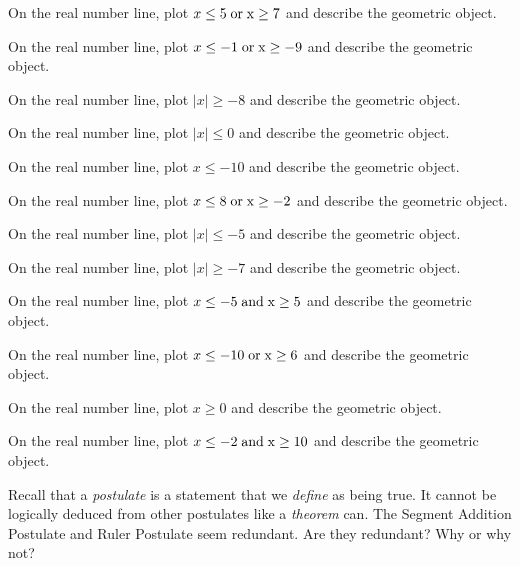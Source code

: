 \documentclass[12pt]{article}
\newenvironment{problem}[2][Problem]{\begin{trivlist}
			\item[\hskip \labelsep {\bfseries #1}\hskip \labelsep {\bfseries #2.}]}{\end{trivlist}}
\begin{document}
			\begin{problem}{0} 
On the real number line, plot $ x \leq 5 \;\rm{ or }\; x \geq 7$ and describe the geometric object.
 \end{problem}\begin{problem}{1} 
On the real number line, plot $ x \leq -1 \;\rm{ or }\; x \geq -9$ and describe the geometric object.
 \end{problem}\begin{problem}{2} 
On the real number line, plot $\mid x\mid \geq -8$ and describe the geometric object.
 \end{problem}\begin{problem}{3} 
On the real number line, plot $\mid x\mid \leq 0$ and describe the geometric object.
 \end{problem}\begin{problem}{4} 
On the real number line, plot $x \leq -10$ and describe the geometric object.
 \end{problem}\begin{problem}{5} 
On the real number line, plot $ x \leq 8 \;\rm{ or }\; x \geq -2$ and describe the geometric object.
 \end{problem}\begin{problem}{6} 
On the real number line, plot $\mid x\mid \leq -5$ and describe the geometric object.
 \end{problem}\begin{problem}{7} 
On the real number line, plot $\mid x\mid \geq -7$ and describe the geometric object.
 \end{problem}\begin{problem}{8} 
On the real number line, plot $ x \leq -5 \;\rm{ and }\; x \geq 5$ and describe the geometric object.
 \end{problem}\begin{problem}{9} 
On the real number line, plot $ x \leq -10 \;\rm{ or }\; x \geq 6$ and describe the geometric object.
 \end{problem}\begin{problem}{10} 
On the real number line, plot $x \geq 0$ and describe the geometric object.
 \end{problem}\begin{problem}{11} 
On the real number line, plot $ x \leq -2 \;\rm{ and }\; x \geq 10$ and describe the geometric object.
 \end{problem}\begin{problem}{Challenge} 

	Recall that a \textit{postulate} is a statement that we \textit{define} as being true. It cannot
	be logically deduced from other postulates like a \textit{theorem} can.
	The Segment Addition Postulate and Ruler Postulate seem redundant. Are they redundant? Why or why not?
	
 \end{problem}
\end{document}

